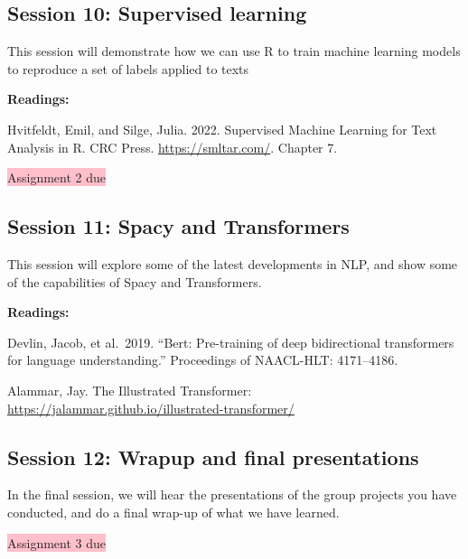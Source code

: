 \documentclass[
]{article}
\begin{document}
\hypertarget{session-10-supervised-learning}{%
\subsection{Session 10: Supervised
learning}\label{session-10-supervised-learning}}

This session will demonstrate how we can use R to train machine learning
models to reproduce a set of labels applied to texts

\textbf{Readings:}

Hvitfeldt, Emil, and Silge, Julia. 2022. Supervised Machine Learning for
Text Analysis in R. CRC Press. \url{https://smltar.com/}. Chapter 7.

\colorbox{pink}{Assignment 2 due}

\hypertarget{session-11-spacy-and-transformers}{%
\subsection{Session 11: Spacy and
Transformers}\label{session-11-spacy-and-transformers}}

This session will explore some of the latest developments in NLP, and
show some of the capabilities of Spacy and Transformers.

\textbf{Readings:}

Devlin, Jacob, et al.~2019. ``Bert: Pre-training of deep bidirectional
transformers for language understanding.'' Proceedings of NAACL-HLT:
4171--4186.

Alammar, Jay. The Illustrated Transformer:
\url{https://jalammar.github.io/illustrated-transformer/}

\hypertarget{session-12-wrapup-and-final-presentations}{%
\subsection{Session 12: Wrapup and final
presentations}\label{session-12-wrapup-and-final-presentations}}

In the final session, we will hear the presentations of the group
projects you have conducted, and do a final wrap-up of what we have
learned.

\colorbox{pink}{Assignment 3 due}

  
\end{document}
